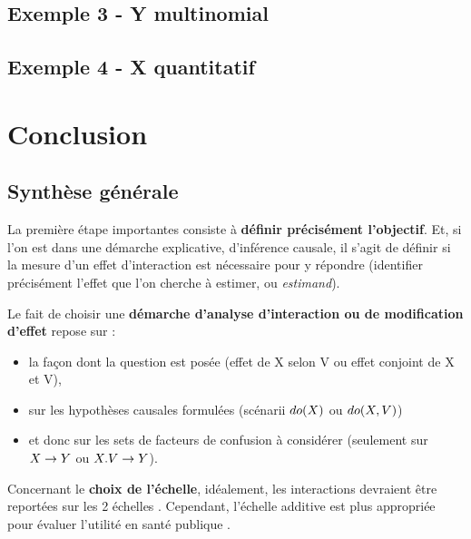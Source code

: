 \documentclass[
]{book}
\providecommand{\tightlist}{%
  \setlength{\itemsep}{0pt}\setlength{\parskip}{0pt}}
\begin{document}
\hypertarget{exemple-3---y-multinomial}{%
\chapter{Exemple 3 - Y multinomial}\label{exemple-3---y-multinomial}}

\hypertarget{exemple-4---x-quantitatif}{%
\chapter{Exemple 4 - X quantitatif}\label{exemple-4---x-quantitatif}}

\hypertarget{part-conclusion}{%
\part{Conclusion}\label{part-conclusion}}

\hypertarget{synthuxe8se-guxe9nuxe9rale}{%
\chapter{Synthèse générale}\label{synthuxe8se-guxe9nuxe9rale}}

La première étape importantes consiste à \textbf{définir précisément l'objectif}. Et, si l'on est dans une démarche explicative, d'inférence causale, il s'agit de définir si la mesure d'un effet d'interaction est nécessaire pour y répondre (identifier précisément l'effet que l'on cherche à estimer, ou \emph{estimand}).

Le fait de choisir une \textbf{démarche d'analyse d'interaction ou de modification d'effet} repose sur :

\begin{itemize}
\tightlist
\item
  la façon dont la question est posée (effet de X selon V ou effet conjoint de X et V),
\item
  sur les hypothèses causales formulées (scénarii \(\small do(X)\) ou \(\small do(X,V)\))
\item
  et donc sur les sets de facteurs de confusion à considérer (seulement sur \(\small X \rightarrow Y\) ou \(\small X.V \rightarrow Y\)).
\end{itemize}

Concernant le \textbf{choix de l'échelle}, idéalement, les interactions devraient être reportées sur les 2 échelles \citet{knol_recommendations_2012} \citet{vanderweele_tutorial_2014}. Cependant, l'échelle additive est plus appropriée pour évaluer l'utilité en santé publique \citet{vanderweele_tutorial_2014} \citet{knol_recommendations_2012}.
\end{document}

